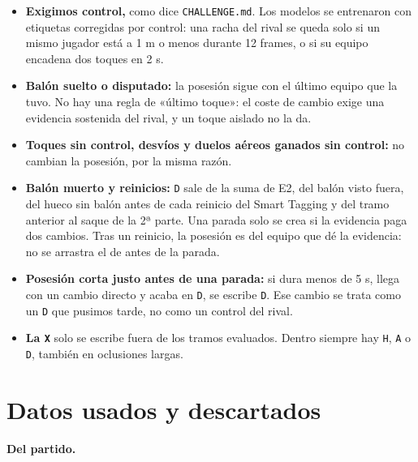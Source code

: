 \documentclass[10pt,a4paper]{article}
\newcommand{\code}[1]{\texttt{\textcolor{codigo}{#1}}}
\begin{document}
\begin{itemize}
  \item \textbf{Exigimos control,} como dice \code{CHALLENGE.\allowbreak{}md}. Los modelos se entrenaron con etiquetas corregidas por control: una racha del rival se queda solo si un mismo jugador está a 1 m o menos durante 12 frames, o si su equipo encadena dos toques en 2 s.
  \item \textbf{Balón suelto o disputado:} la posesión sigue con el último equipo que la tuvo. No hay una regla de «último toque»: el coste de cambio exige una evidencia sostenida del rival, y un toque aislado no la da.
  \item \textbf{Toques sin control, desvíos y duelos aéreos ganados sin control:} no cambian la posesión, por la misma razón.
  \item \textbf{Balón muerto y reinicios:} \code{D} sale de la suma de E2, del balón visto fuera, del hueco sin balón antes de cada reinicio del Smart Tagging y del tramo anterior al saque de la 2ª parte. Una parada solo se crea si la evidencia paga dos cambios. Tras un reinicio, la posesión es del equipo que dé la evidencia: no se arrastra el de antes de la parada.
  \item \textbf{Posesión corta justo antes de una parada:} si dura menos de 5 s, llega con un cambio directo y acaba en \code{D}, se escribe \code{D}. Ese cambio se trata como un \code{D} que pusimos tarde, no como un control del rival.
  \item \textbf{La \code{X}} solo se escribe fuera de los tramos evaluados. Dentro siempre hay \code{H}, \code{A} o \code{D}, también en oclusiones largas.
\end{itemize}

\section{Datos usados y descartados}\label{sec:4}

\textbf{Del partido.}
\end{document}
